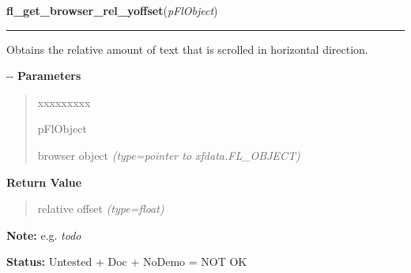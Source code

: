 \hspace{.8\funcindent}\begin{boxedminipage}{\funcwidth}

    \raggedright \textbf{fl\_get\_browser\_rel\_yoffset}(\textit{pFlObject})

    \vspace{-1.5ex}

    \rule{\textwidth}{0.5\fboxrule}
\setlength{\parskip}{2ex}

Obtains the relative amount of text that is scrolled in horizontal
direction.

-{}-
\setlength{\parskip}{1ex}
      \textbf{Parameters}
      \vspace{-1ex}

      \begin{quote}
        \begin{Ventry}{xxxxxxxxx}

          \item[pFlObject]


browser object
            {\it (type=pointer to xfdata.FL\_OBJECT)}

        \end{Ventry}

      \end{quote}

      \textbf{Return Value}
    \vspace{-1ex}

      \begin{quote}

relative offset
      {\it (type=float)}

      \end{quote}

\textbf{Note:} 
e.g. \emph{todo}


\textbf{Status:} 
Untested + Doc + NoDemo = NOT OK


    \end{boxedminipage}

    \label{xformslib:flbrowser:fl_set_browser_yoffset}

    \vspace{0.5ex}

